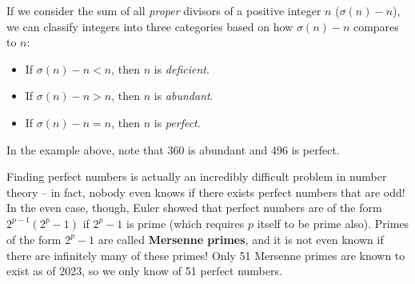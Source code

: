 \begin{remark}
    If we consider the sum of all \textit{proper} divisors of a positive 
    integer $n$ ($\sigma(n) - n$), we can classify integers into three categories
    based on how $\sigma(n) - n$ compares to $n$: 
    \begin{itemize}
        \item If $\sigma(n) - n < n$, then $n$ is \textit{deficient}. 
        \item If $\sigma(n) - n > n$, then $n$ is \textit{abundant}.
        \item If $\sigma(n) - n = n$, then $n$ is \textit{perfect}.
    \end{itemize}
    In the example above, note that 360 is abundant and 496 is perfect. 

    Finding perfect numbers is actually an incredibly difficult problem in 
    number theory -- in fact, nobody even knows if there exists perfect
    numbers that are odd! In the even case, though, Euler showed that 
    perfect numbers are of the form $2^{p-1}(2^p - 1)$ if $2^p - 1$ is prime 
    (which requires $p$ itself to be prime also). Primes of the form $2^p - 1$
    are called \textbf{Mersenne primes}, and it is not even known if there
    are infinitely many of these primes! Only 51 Mersenne primes are known 
    to exist as of 2023, so we only know of 51 perfect numbers. 

\end{remark}